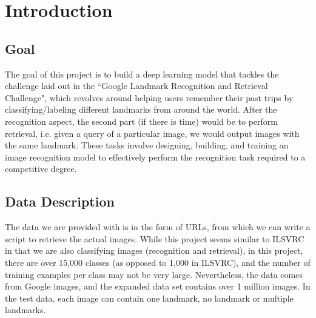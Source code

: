 \section{Introduction}
\subsection{Goal}
The goal of this project is to build a deep learning model that tackles the challenge laid out in the ``Google Landmark Recognition and Retrieval Challenge", which revolves around helping users remember their past trips by classifying/labeling different landmarks from around the world. After the recognition aspect, the second part (if there is time) would be to perform retrieval, i.e. given a query of a particular image, we would output images with the same landmark. These tasks involve designing, building, and training an image recognition model to effectively perform the recognition task required to a competitive degree.
\subsection{Data Description}
The data we are provided with is in the form of URLs, from which we can write a script to retrieve the actual images. While this project seems similar to ILSVRC in that we are also classifying images (recognition and retrieval), in this project, there are over 15,000 classes (as opposed to 1,000 in ILSVRC), and the number of training examples per class may not be very large. Nevertheless, the data comes from Google images, and the expanded data set contains over 1 million images. In the test data, each image can contain one landmark, no landmark or multiple landmarks.